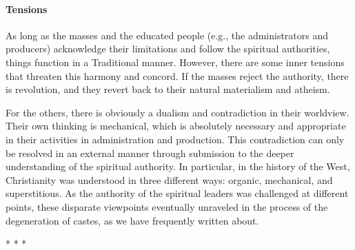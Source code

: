 \paragraph{Tensions}
As long as the masses and the educated people (e.g., the administrators and producers) acknowledge their limitations and follow the spiritual authorities, things function in a Traditional manner. However, there are some inner tensions that threaten this harmony and concord. If the masses reject the authority, there is revolution, and they revert back to their natural materialism and atheism.

For the others, there is obviously a dualism and contradiction in their worldview. Their own thinking is mechanical, which is absolutely necessary and appropriate in their activities in administration and production. This contradiction can only be resolved in an external manner through submission to the deeper understanding of the spiritual authority. In particular, in the history of the West, Christianity was understood in three different ways: organic, mechanical, and superstitious. As the authority of the spiritual leaders was challenged at different points, these disparate viewpoints eventually unraveled in the process of the degeneration of castes, as we have frequently written about.




\begin{center}* * *\end{center}

